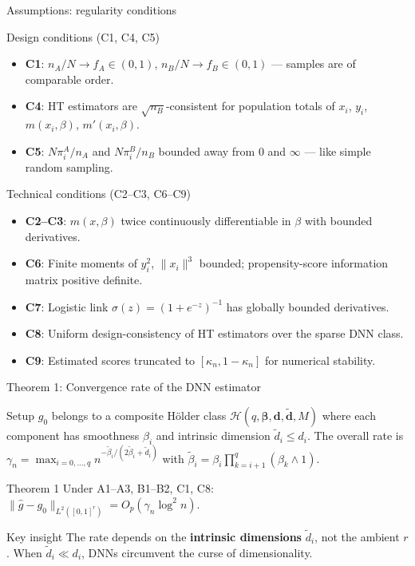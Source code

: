 \documentclass[aspectratio=169,11pt]{beamer}
\begin{document}
\begin{frame}{Assumptions: regularity conditions}
\begin{block}{Design conditions (C1, C4, C5)}
\begin{itemize}
  \item \textbf{C1}: $n_A/N\to f_A\in(0,1)$, $n_B/N\to f_B\in(0,1)$ — samples are of comparable order.
  \item \textbf{C4}: HT estimators are $\sqrt{n_B}$-consistent for population totals of $x_i$, $y_i$, $m(x_i,\beta)$, $m'(x_i,\beta)$.
  \item \textbf{C5}: $N\pi_i^A/n_A$ and $N\pi_i^B/n_B$ bounded away from 0 and $\infty$ — like simple random sampling.
\end{itemize}
\end{block}
\begin{block}{Technical conditions (C2--C3, C6--C9)}
\begin{itemize}
  \item \textbf{C2--C3}: $m(x,\beta)$ twice continuously differentiable in $\beta$ with bounded derivatives.
  \item \textbf{C6}: Finite moments of $y_i^2$, $\|x_i\|^3$ bounded; propensity-score information matrix positive definite.
  \item \textbf{C7}: Logistic link $\sigma(z)=(1+e^{-z})^{-1}$ has globally bounded derivatives.
  \item \textbf{C8}: Uniform design-consistency of HT estimators over the sparse DNN class.
  \item \textbf{C9}: Estimated scores truncated to $[\kappa_n,1-\kappa_n]$ for numerical stability.
\end{itemize}
\end{block}
\end{frame}

\begin{frame}{Theorem 1: Convergence rate of the DNN estimator}
\begin{block}{Setup}
$g_0$ belongs to a composite H\"older class $\mathcal{H}(q,\boldsymbol{\beta},\mathbf{d},\tilde{\mathbf{d}},M)$ where each component has smoothness $\beta_i$ and intrinsic dimension $\tilde{d}_i\le d_i$. The overall rate is $\gamma_n=\max_{i=0,\ldots,q} n^{-\tilde{\beta}_i/(2\tilde{\beta}_i+\tilde{d}_i)}$ with $\tilde{\beta}_i=\beta_i\prod_{k=i+1}^{q}(\beta_k\wedge 1)$.
\end{block}
\begin{block}{Theorem 1}
Under A1--A3, B1--B2, C1, C8: $\|\hat{g}-g_0\|_{L^2([0,1]^r)}=O_p(\gamma_n\log^2 n).$
\end{block}
\begin{alertblock}{Key insight}
The rate depends on the \textbf{intrinsic dimensions} $\tilde{d}_i$, not the ambient $r$. When $\tilde{d}_i\ll d_i$, DNNs circumvent the curse of dimensionality.
\end{alertblock}
\end{frame}
\end{document}
